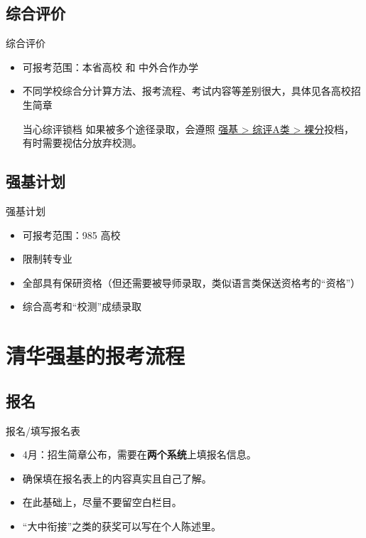 \documentclass{beamer}
\begin{document}
\subsection{综合评价}
\begin{frame}{综合评价}
    \begin{itemize}
        \pause
        \item 可报考范围：本省高校 和 中外合作办学
        \item 不同学校综合分计算方法、报考流程、考试内容等差别很大，具体见各高校招生简章
        \pause
        \begin{alertblock}{当心综评锁档}
            如果被多个途径录取，会遵照 \underline{强基 > 综评A类 > 裸分}投档，有时需要视估分放弃校测。
        \end{alertblock}
    \end{itemize}
\end{frame}

\subsection{强基计划}
\begin{frame}{强基计划}
    \begin{itemize}
        \pause
        \item 可报考范围：985 高校
        \item 限制转专业
        \item 全部具有保研资格（但还需要被导师录取，类似语言类保送资格考的“资格”）
        \item 综合高考和“校测”成绩录取
    \end{itemize}
\end{frame}

\section{清华强基的报考流程}

\subsection{报名}
\begin{frame}{报名/填写报名表}
    \begin{itemize}
        \pause
        \item 4月：招生简章公布，需要在\textbf{两个系统}上填报名信息。
        \pause
        \item 确保填在报名表上的内容真实且自己了解。
        \item 在此基础上，尽量不要留空白栏目。
        \pause
        \item “大中衔接”之类的获奖可以写在个人陈述里。
    \end{itemize}
\end{frame}
\end{document}
